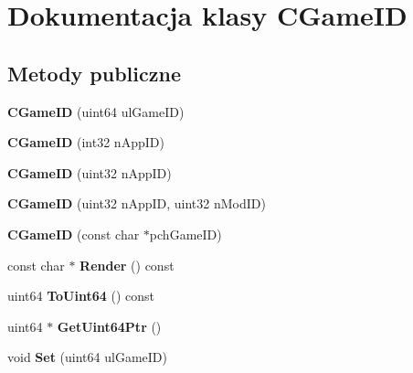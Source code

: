 \hypertarget{class_c_game_i_d}{}\section{Dokumentacja klasy C\+Game\+ID}
\label{class_c_game_i_d}
\subsection*{Metody publiczne}
\begin{DoxyCompactItemize}
\item 
\mbox{\label{class_c_game_i_d_a3f833c2bd97da350cdb77fa264b3c9e2}} 
{\bfseries C\+Game\+ID} (uint64 ul\+Game\+ID)
\item 
\mbox{\label{class_c_game_i_d_a96e5600addc687e432945d102591b61d}} 
{\bfseries C\+Game\+ID} (int32 n\+App\+ID)
\item 
\mbox{\label{class_c_game_i_d_a7845bba8193c37dcf1bb2c1bff8bba7a}} 
{\bfseries C\+Game\+ID} (uint32 n\+App\+ID)
\item 
\mbox{\label{class_c_game_i_d_a198b763a13ab6406b07d529ea6071d19}} 
{\bfseries C\+Game\+ID} (uint32 n\+App\+ID, uint32 n\+Mod\+ID)
\item 
\mbox{\label{class_c_game_i_d_a0955f9635e905aa9e249ce5067c00ce4}} 
{\bfseries C\+Game\+ID} (const char $\ast$pch\+Game\+ID)
\item 
\mbox{\label{class_c_game_i_d_a66ba682768457cc2a11156f7ef84d2eb}} 
const char $\ast$ {\bfseries Render} () const
\item 
\mbox{\label{class_c_game_i_d_a8947361b0dfead37ebf4207a40d835d1}} 
uint64 {\bfseries To\+Uint64} () const
\item 
\mbox{\label{class_c_game_i_d_a2af52420d7023920dc5114b763b53fad}} 
uint64 $\ast$ {\bfseries Get\+Uint64\+Ptr} ()
\item 
\mbox{\label{class_c_game_i_d_a0d3c64046047f1924be71178ac96fde1}} 
void {\bfseries Set} (uint64 ul\+Game\+ID)
\item 

\end{DoxyCompactItemize}
